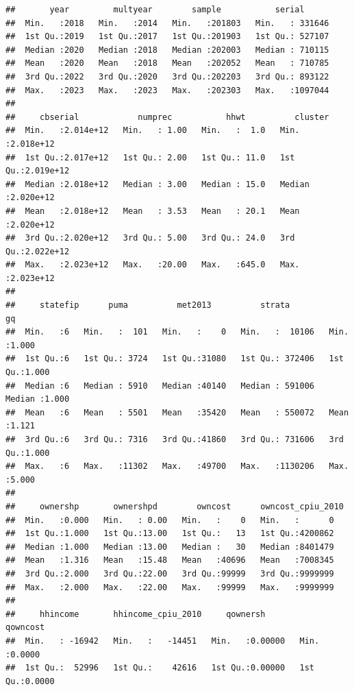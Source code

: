 \documentclass[
]{article}
\begin{document}
\begin{verbatim}
##       year         multyear        sample           serial       
##  Min.   :2018   Min.   :2014   Min.   :201803   Min.   : 331646  
##  1st Qu.:2019   1st Qu.:2017   1st Qu.:201903   1st Qu.: 527107  
##  Median :2020   Median :2018   Median :202003   Median : 710115  
##  Mean   :2020   Mean   :2018   Mean   :202052   Mean   : 710785  
##  3rd Qu.:2022   3rd Qu.:2020   3rd Qu.:202203   3rd Qu.: 893122  
##  Max.   :2023   Max.   :2023   Max.   :202303   Max.   :1097044  
##                                                                  
##     cbserial            numprec           hhwt          cluster         
##  Min.   :2.014e+12   Min.   : 1.00   Min.   :  1.0   Min.   :2.018e+12  
##  1st Qu.:2.017e+12   1st Qu.: 2.00   1st Qu.: 11.0   1st Qu.:2.019e+12  
##  Median :2.018e+12   Median : 3.00   Median : 15.0   Median :2.020e+12  
##  Mean   :2.018e+12   Mean   : 3.53   Mean   : 20.1   Mean   :2.020e+12  
##  3rd Qu.:2.020e+12   3rd Qu.: 5.00   3rd Qu.: 24.0   3rd Qu.:2.022e+12  
##  Max.   :2.023e+12   Max.   :20.00   Max.   :645.0   Max.   :2.023e+12  
##                                                                         
##     statefip      puma          met2013          strata              gq       
##  Min.   :6   Min.   :  101   Min.   :    0   Min.   :  10106   Min.   :1.000  
##  1st Qu.:6   1st Qu.: 3724   1st Qu.:31080   1st Qu.: 372406   1st Qu.:1.000  
##  Median :6   Median : 5910   Median :40140   Median : 591006   Median :1.000  
##  Mean   :6   Mean   : 5501   Mean   :35420   Mean   : 550072   Mean   :1.121  
##  3rd Qu.:6   3rd Qu.: 7316   3rd Qu.:41860   3rd Qu.: 731606   3rd Qu.:1.000  
##  Max.   :6   Max.   :11302   Max.   :49700   Max.   :1130206   Max.   :5.000  
##                                                                               
##     ownershp       ownershpd        owncost      owncost_cpiu_2010
##  Min.   :0.000   Min.   : 0.00   Min.   :    0   Min.   :      0  
##  1st Qu.:1.000   1st Qu.:13.00   1st Qu.:   13   1st Qu.:4200862  
##  Median :1.000   Median :13.00   Median :   30   Median :8401479  
##  Mean   :1.316   Mean   :15.48   Mean   :40696   Mean   :7008345  
##  3rd Qu.:2.000   3rd Qu.:22.00   3rd Qu.:99999   3rd Qu.:9999999  
##  Max.   :2.000   Max.   :22.00   Max.   :99999   Max.   :9999999  
##                                                                   
##     hhincome       hhincome_cpiu_2010     qownersh          qowncost     
##  Min.   : -16942   Min.   :   -14451   Min.   :0.00000   Min.   :0.0000  
##  1st Qu.:  52996   1st Qu.:    42616   1st Qu.:0.00000   1st Qu.:0.0000  

\end{verbatim}
\end{document}
